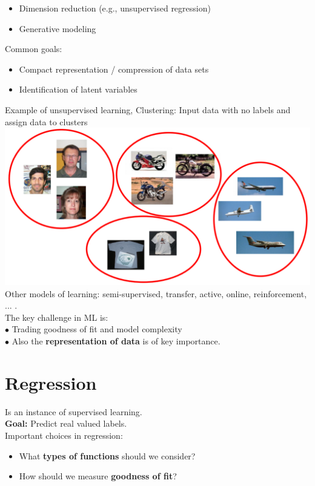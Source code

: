\documentclass[a4paper, fontsize=8pt, landscape, DIV=1]{scrartcl}
\begin{document}
\begin{multicols*}{4}
\begin{itemize}[noitemsep]
\begin{itemize}[noitemsep]
				\item Dimension reduction (e.g., unsupervised regression)
				\item Generative modeling
			\end{itemize}
			Common goals: 
			\begin{itemize}
				\item Compact representation / compression of data sets
				\item Identification of latent variables
			\end{itemize}
		\end{itemize}
		Example of unsupervised learning, Clustering: Input data with no labels and assign data to clusters
		\includegraphics[width=0.85\columnwidth]{images/Introduction/clustering.png}\\
		Other models of learning: semi-supervised, transfer, active, online, reinforcement, ... .\\
		The key challenge in ML is: \\
		$\bullet$ Trading goodness of fit and model complexity\\
		$\bullet$ Also the \textbf{representation of data} is of key importance. 
		
		\section{Regression}
		Is an instance of supervised learning.\\
		\textbf{Goal:} Predict real valued labels.\\
		Important choices in regression:
		\vspace{-0.1cm}
		\begin{itemize}[noitemsep,nolistsep]
			\item What \textbf{types of functions} should we consider?
			\item How should we measure \textbf{goodness of fit}?
		\end{itemize}
	

\end{multicols*}
\end{document}

